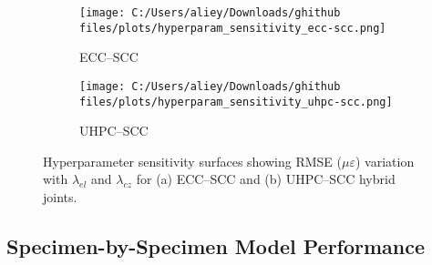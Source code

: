 \documentclass{article}
\begin{document}
\begin{figure}[H]
    \centering
    \begin{subfigure}[t]{0.48\textwidth}
        \centering
        \texttt{[image: C:/Users/aliey/Downloads/ghithub files/plots/hyperparam\_sensitivity\_ecc-scc.png]}
        \caption{ECC–SCC}
        \label{fig:hyp_sensitivity_ecc_scc}
    \end{subfigure}
    \hfill
    \begin{subfigure}[t]{0.48\textwidth}
        \centering
        \texttt{[image: C:/Users/aliey/Downloads/ghithub files/plots/hyperparam\_sensitivity\_uhpc-scc.png]}
        \caption{UHPC–SCC}
        \label{fig:hyp_sensitivity_uhpc_scc}
    \end{subfigure}

    \caption{Hyperparameter sensitivity surfaces showing RMSE ($\mu\varepsilon$) variation with $\lambda_{el}$ and $\lambda_{cz}$ for (a) ECC–SCC and (b) UHPC–SCC hybrid joints.}
    \label{fig:hyp_sensitivity_combined}
\end{figure}




\subsection{Specimen-by-Specimen Model Performance}
\label{subsec:SbSMp}
\end{document}
